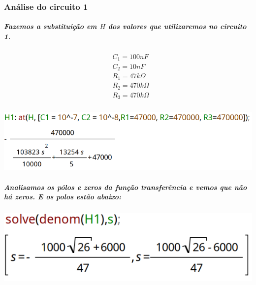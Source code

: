 \documentclass[12pt,twoside, a4paper, twocolumn]{article}
\begin{document}
\subsubsection{Análise do circuito 1}


\subparagraph*{Fazemos a substituição em $H$ dos valores que utilizaremos no circuito 1.}




\begin{equation*}
    \begin{aligned}
         & C_1  = 100nF          \\
         & C_2  = 10nF           \\
         & R_1  = 47k \varOmega  \\
         & R_2  = 470k \varOmega \\
         & R_3  = 470k \varOmega
    \end{aligned}
\end{equation*}




\subparagraph*{}




\begin{adjustbox}{scale=0.34}
    \includegraphics{H1.png}
\end{adjustbox}




\subparagraph*{Analisamos os pólos e zeros da função transferência e vemos que não há zeros. E os polos estão abaixo:}


\subparagraph*{}


\begin{adjustbox}{scale=0.5}
    \includegraphics{H1denom.png}
\end{adjustbox}
\end{document}
